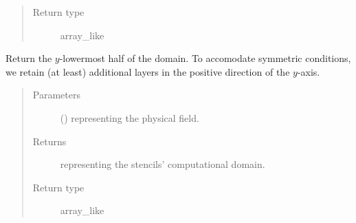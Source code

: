 \documentclass[letterpaper,10pt,english]{sphinxmanual}
\begin{document}
\begin{fulllineitems}
\begin{fulllineitems}
\begin{quote}
\begin{description}
\item[{Return type}] \leavevmode
array\_like

\end{description}\end{quote}

\end{fulllineitems}


\begin{fulllineitems}
\label{\detokenize{api:dycore.horizontal_boundary.RelaxedSymmetricXZ.from_physical_to_computational_domain}}
Return the \(y\)-lowermost half of the domain. To accomodate symmetric conditions,
we retain (at least)  additional layers in the positive direction of the \(y\)-axis.
\begin{quote}\begin{description}
\item[{Parameters}] \leavevmode
{} () \textendash{}  representing the physical field.

\item[{Returns}] \leavevmode
{} representing the stencils’ computational domain.

\item[{Return type}] \leavevmode
array\_like

\end{description}\end{quote}

\end{fulllineitems}


\end{fulllineitems}

\end{document}

